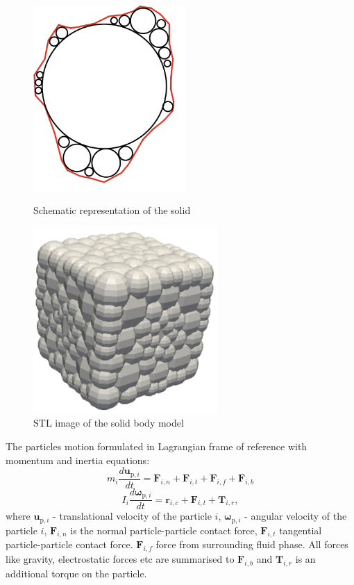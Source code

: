 \begin{figure}[!htp]
\centering
\parbox{7cm}{
\includegraphics[width=5.8cm]{Images/clump1.png}
\caption{Schematic representation of the solid}
\label{fig:3figsA}}
\qquad
\begin{minipage}{7cm}
\includegraphics[width=7cm]{Images/clump2.png}
\caption{STL image of the solid body model}
\label{fig:3figsB}
\end{minipage}
\end{figure}
The particles motion formulated in Lagrangian frame of reference \cite{cundall1979discrete} with momentum and inertia equations:
\begin{equation}\label{solid_body_force}
m_{i} \frac{d \boldsymbol{u}_{\mathrm{p}, i}}{d t}= \mathbf{F}_{i,n} + \mathbf{F}_{i,t} + \mathbf{F}_{i,f} + \mathbf{F}_{i,b}
\end{equation}
\begin{equation}
I_{i} \frac{d \boldsymbol{\omega}_{\mathrm{p}, i}}{d t}= \mathbf{r}_{i,c}+\mathbf{F}_{i,t}+\mathbf{T}_{i,r},
\end{equation}
where $\mathbf{u}_{\mathrm{p}, i}$ - translational velocity of the particle $i$, $\boldsymbol{\omega}_{\mathrm{p}, i}$ - angular velocity of the particle $i$, $\mathbf{F}_{i,n}$ is the normal particle-particle contact force, $\mathbf{F}_{i,t}$ tangential particle-particle contact force. $\mathbf{F}_{i,f}$ force from surrounding fluid phase. All forces like gravity, electrostatic forces etc are summarised to $\mathbf{F}_{i,b}$ and $\mathbf{T}_{i,r}$ is an additional torque on the particle.

